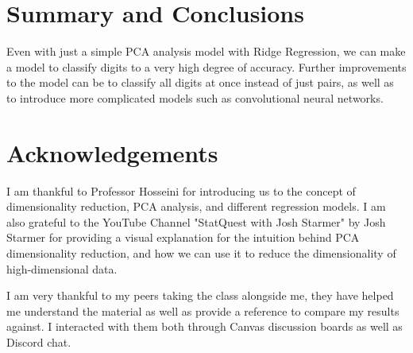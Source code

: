 \documentclass[11pt]{amsart}
\begin{document}


\section{Summary and Conclusions}\label{sec:conclusions}
Even with just a simple PCA analysis model with Ridge Regression, we can make a model to 
classify digits to a very high degree of accuracy. Further improvements to the model can 
be to classify all digits at once instead of just pairs, as well as to introduce more 
complicated models such as convolutional neural networks.


\section*{Acknowledgements}

I am thankful to Professor Hosseini for introducing us to the concept of dimensionality reduction, PCA analysis, and 
different regression models. I am also grateful to the YouTube Channel "StatQuest with Josh Starmer" by Josh Starmer for providing
a visual explanation for the intuition behind PCA dimensionality reduction, and how we can use it to reduce the 
dimensionality of high-dimensional data. 

I am very thankful to my peers taking the class alongside me, they have helped me understand the material as well
as provide a reference to compare my results against. I interacted with them both through Canvas discussion boards
as well as Discord chat. 




\cite{Hunter:2007}
\cite{harris2020array}
\cite{hosseini10_2022}
\cite{hosseini12_2022}
\cite{hosseini13_2022}
\cite{scikit-learn}
\end{document}
